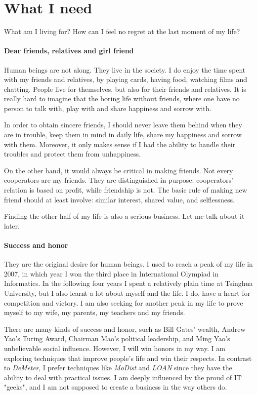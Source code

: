 \section{What I need}

What am I living for? How can I feel no regret at the last moment of my life? 

\paragraph{Dear friends, relatives and girl friend} 
Human beings are not along. They live in the society. I do enjoy the time spent with my friends and relatives, by playing cards, having food, watching films and chatting. People live for themselves, but also for their friends and relatives. It is really hard to imagine that the boring life without friends, where one have no person to talk with, play with and share happiness and sorrow with.

In order to obtain sincere friends, I should never leave them behind when they are in trouble, keep them in mind in daily life, share my happiness and sorrow with them. Moreover, it only makes sense if I had the ability to handle their troubles and protect them from unhappiness.

On the other hand, it would always be critical in making friends. Not every cooperators are my friends. They are distinguished in purpose: cooperators' relation is based on profit, while friendship is not. The basic rule of making new friend should at least involve: similar interest, shared value, and selflessness.

Finding the other half of my life is also a serious business. Let me talk about it later.

\paragraph{Success and honor} 
They are the original desire for human beings. I used to reach a peak of my life in 2007, in which year I won the third place in International Olympiad in Informatics. In the following four years I spent a relatively plain time at Tsinghua University, but I also learnt a lot about myself and the life. I do, have a heart for competition and victory. I am also seeking for another peak in my life to prove myself to my wife, my parents, my teachers and my friends.

There are many kinds of success and honor, such as Bill Gates' wealth, Andrew Yao's Turing Award, Chairman Mao's political leadership, and Ming Yao's unbelievable social influence. However, I will win honors in my way. I am exploring techniques that improve people's life and win their respects. In contrast to \emph{DeMeter}, I prefer techniques like \emph{MoDist} and \emph{LOAN} since they have the ability to deal with practical issues. I am deeply influenced by the proud of IT "geeks", and I am not supposed to create a business in the way others do.


